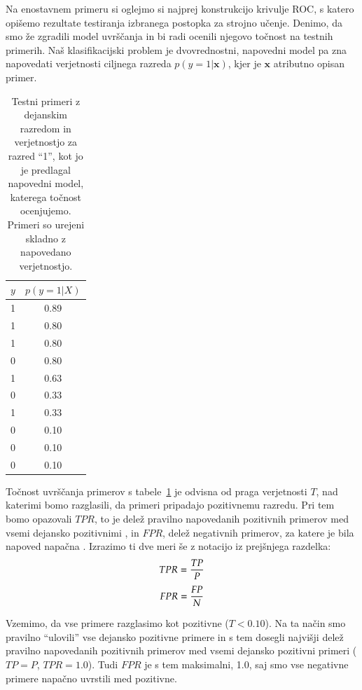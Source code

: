 Na enostavnem primeru si oglejmo si najprej konstrukcijo krivulje ROC, s katero opišemo rezultate testiranja izbranega postopka za strojno učenje. Denimo, da smo že zgradili model uvrščanja in bi radi ocenili njegovo točnost na testnih primerih. Naš klasifikacijski problem je dvovrednostni, napovedni model pa zna napovedati verjetnosti ciljnega razreda $p(y=1|{\bm x})$, kjer je ${\bm x}$ atributno opisan primer.

\begin{table}[htbp]
\caption{Testni primeri z dejanskim razredom in verjetnostjo za razred ``1'', kot jo je predlagal napovedni model, katerega točnost ocenjujemo. Primeri so urejeni skladno z napovedano verjetnostjo.}
\label{t-auc}
\begin{center}
\begin{tabular}{cc}
\toprule
$y$ & $p(y=1|X)$ \\
\midrule
1 & 0.89 \\
1 & 0.80 \\
1 & 0.80 \\
0 & 0.80 \\
1 & 0.63 \\
0 & 0.33 \\
1 & 0.33 \\
0 & 0.10 \\
0 & 0.10 \\
0 & 0.10 \\
\bottomrule
\end{tabular}
\end{center}
\end{table}

Točnost uvrščanja primerov s tabele~\ref{t-auc} je odvisna od praga verjetnosti $T$, nad katerimi bomo razglasili, da primeri pripadajo pozitivnemu razredu. Pri tem bomo opazovali $TPR$, to je delež pravilno napovedanih pozitivnih primerov med vsemi dejansko pozitivnimi , in $FPR$, delež negativnih primerov, za katere je bila napoved napačna . Izrazimo ti dve meri še z notacijo iz prejšnjega razdelka:
$$ TPR = {TP \over P} $$
$$ FPR = {FP \over N} $$

Vzemimo, da vse primere razglasimo kot pozitivne ($T<0.10$). Na ta način smo pravilno ``ulovili'' vse dejansko pozitivne primere in s tem dosegli najvišji delež pravilno napovedanih pozitivnih primerov med vsemi dejansko pozitivni primeri ($TP=P$, $TPR=1.0$). Tudi $FPR$ je s tem maksimalni, 1.0, saj smo vse negativne primere napačno uvrstili med pozitivne.


